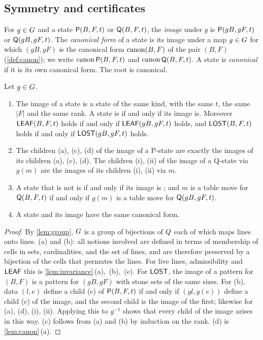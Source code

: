 \subsection{Symmetry and certificates}\label{sec:cert}

For $g\in G$ and a state $\mathsf{P}(B,F,t)$ or $\mathsf{Q}(B,F,t)$, the \emph{image} under $g$ is $\mathsf{P}(gB,gF,t)$ or
$\mathsf{Q}(gB,gF,t)$. The \emph{canonical form} of a state is its image under a map $g\in G$ for which
$(gB,gF)$ is the canonical form $\operatorname{canon}(B,F)$ of the pair $(B,F)$ (\cref{def:canon}); we
write $\operatorname{canon}\mathsf{P}(B,F,t)$ and $\operatorname{canon}\mathsf{Q}(B,F,t)$. A state is \emph{canonical} if it is its own canonical
form. The root is canonical.

\begin{lemma}\label{lem:game-invariance}
Let $g\in G$.
\begin{enumerate}[label=\textup{(\alph*)},leftmargin=2.4em]
\item The image of a state is a state of the same kind, with the same $t$, the same $|F|$ and the same rank.
  A state is \VOID{} if and only if its image is. Moreover $\mathsf{LEAF}(B,F,t)$ holds if and only if
  $\mathsf{LEAF}(gB,gF,t)$ holds, and $\mathsf{LOST}(B,F,t)$ holds if and only if $\mathsf{LOST}(gB,gF,t)$ holds.
\item The children \textup{(a)}, \textup{(c)}, \textup{(d)} of the image of a P-state are exactly the images
  of its children \textup{(a)}, \textup{(c)}, \textup{(d)}. The children \textup{(i)}, \textup{(ii)} of the
  image of a Q-state via $g(m)$ are the images of its children \textup{(i)}, \textup{(ii)} via $m$.
\item A state that is not \VOID{} is \WON{} if and only if its image is \WON; and $m$ is a table move for
  $\mathsf{Q}(B,F,t)$ if and only if $g(m)$ is a table move for $\mathsf{Q}(gB,gF,t)$.
\item A state and its image have the same canonical form.
\end{enumerate}
\end{lemma}

\begin{proof}
By \cref{lem:group}, $G$ is a group of bijections of $Q$ each of which maps lines onto lines.
(a) and (b): all notions involved are defined in terms of membership of cells in sets, cardinalities, and
the set of lines, and are therefore preserved by a bijection of the cells that permutes the lines. For live
lines, admissibility and $\mathsf{LEAF}$ this is \cref{lem:invariance}\,(a),~(b),~(e). For $\mathsf{LOST}$, the image of a pattern for
$(B,F)$ is a pattern for $(gB,gF)$ with stone sets of the same sizes. For (b), data $(l,e)$ define a
child \textup{(c)} of $\mathsf{P}(B,F,t)$ if and only if $(gl,g(e))$ define a child \textup{(c)} of the image, and
the second child is the image of the first; likewise for \textup{(a)}, \textup{(d)}, \textup{(i)},
\textup{(ii)}. Applying this to $g^{-1}$ shows that every child of the image arises in this way.
(c) follows from (a) and (b) by induction on the rank. (d) is \cref{lem:canon}\,(a).
\end{proof}

